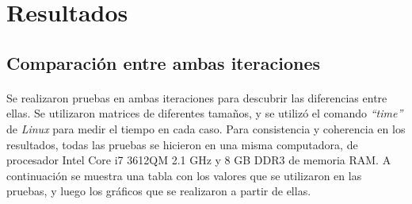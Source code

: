 \documentclass[a4paper,11pt]{article}
\begin{document}
\newpage
\section{Resultados}
\subsection{Comparaci\'on entre ambas iteraciones}
\paragraph{}
Se realizaron pruebas en ambas iteraciones para descubrir las diferencias entre
ellas. Se utilizaron matrices de diferentes tamaños, y se utiliz\'o el comando
\emph{``time''} de \emph{Linux} para medir el tiempo en cada caso. Para
consistencia y coherencia en los resultados, todas las pruebas se hicieron en
una misma computadora, de procesador Intel Core i7 3612QM 2.1 GHz y 8 GB DDR3
de memoria RAM. A continuaci\'on se muestra una tabla con los valores que se
utilizaron en las pruebas, y luego los gr\'aficos que se realizaron a partir de
ellas.\\
\\
\end{document}
